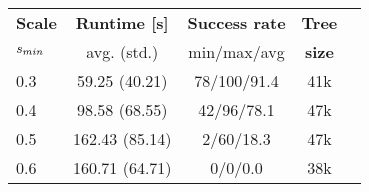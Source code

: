 \begin{tabular}{lcccc}
\toprule
{\bf Scale} & {\bf Runtime [s] } & {\bf Success rate} & {\bf Tree}\\ 
{$s_{min}$ }  & avg. (std.)       & min/max/avg & {\bf size } \\ 
\midrule
0.3 & 59.25 (40.21) & 78/100/91.4 & 41k  \\
0.4 & 98.58 (68.55) & 42/96/78.1 & 47k  \\
0.5 & 162.43 (85.14) & 2/60/18.3 & 47k  \\
0.6 & 160.71 (64.71) & 0/0/0.0 & 38k  \\
\bottomrule
\end{tabular}
